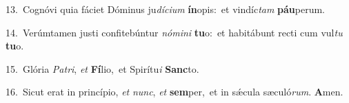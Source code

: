 {\numbfont\textcolor{\numbcolor}{13.}}~Cognóvi quia fáciet Dóminus ju\-\textit{dí}\-\textit{ci}\textit{um} \textbf{ín}\-opis:~\star et vindíc\textit{tam} \textbf{páu}\-perum.\par
{\numbfont\textcolor{\numbcolor}{14.}}~Verúmtamen justi confitebúntur \textit{nó}\-\textit{mi}\textit{ni} \textbf{tu}\-o:~\star et habitábunt recti cum vul\textit{tu} \textbf{tu}\-o.\par
{\numbfont\textcolor{\numbcolor}{15.}}~Glória \textit{Pa}\-\textit{tri}, \textit{et} \textbf{Fí}\-lio,~\star et Spirítu\textit{i} \textbf{Sanc}\-to.\par
{\numbfont\textcolor{\numbcolor}{16.}}~Sicut erat in princípio, \textit{et} \textit{nunc}\-, \textit{et} \textbf{sem}\-per,~\star et in sǽcula sæculó\-\textit{rum}\-. \textbf{A}\-men.\par
